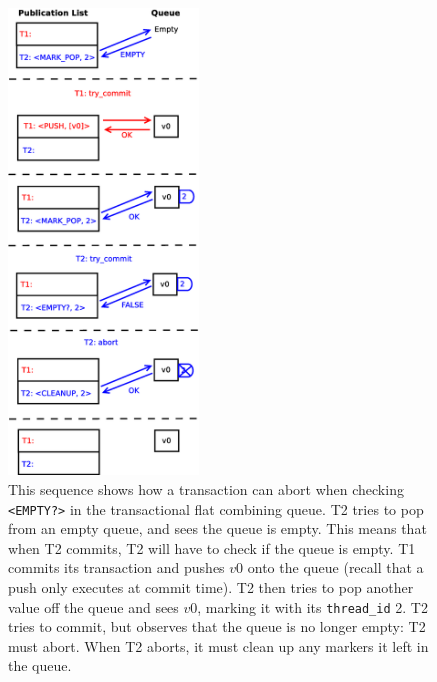 \begin{figure}[H]
\centering
\includegraphics[width=0.45\textwidth]{fcqueue_abort2}
    \caption[Abort and cleanup when checking the empty status of the queue]{This sequence shows how a transaction can abort when checking \texttt{<EMPTY?>} in the transactional flat combining queue. T2 tries to pop from an empty queue, and sees the queue is empty. This means that when T2 commits, T2 will have to check if the queue is empty. T1 commits its transaction and pushes $v0$ onto the queue (recall that a push only executes at commit time). T2 then tries to pop another value off the queue and sees $v0$, marking it with its \texttt{thread\_id} 2. T2 tries to commit, but observes that the queue is no longer empty: T2 must abort. When T2 aborts, it must clean up any markers it left in the queue.}
\label{fig:fcqueue_abort2}
\end{figure}

